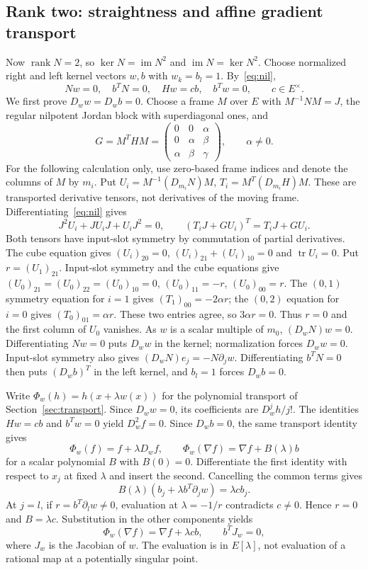 \documentclass[11pt,a4paper]{article}
\newcommand{\rank}{\operatorname{rank}}
\newcommand{\im}{\operatorname{im}}
\begin{document}
\subsection{Rank two: straightness and affine gradient transport}
Now $\rank N=2$, so $\ker N=\im N^2$ and $\im N=\ker N^2$. Choose normalized right and left kernel vectors $w,b$ with $w_k=b_l=1$. By~\eqref{eq:nil},
\[
 Nw=0,\quad b^TN=0,\quad Hw=cb,\quad b^Tw=0,
 \qquad c\in E^\times.
\]
We first prove $D_ww=D_wb=0$. Choose a frame $M$ over $E$ with $M^{-1}NM=J$, the regular nilpotent Jordan block with superdiagonal ones, and
\[
 G=M^THM=\begin{pmatrix}0&0&\alpha\\0&\alpha&\beta\\\alpha&\beta&\gamma\end{pmatrix},\qquad\alpha\ne0.
\]
For the following calculation only, use zero-based frame indices and denote the columns of $M$ by $m_i$. Put $U_i=M^{-1}(D_{m_i}N)M$, $T_i=M^T(D_{m_i}H)M$. These are transported derivative tensors, not derivatives of the moving frame. Differentiating~\eqref{eq:nil} gives
\[
 J^2U_i+JU_iJ+U_iJ^2=0,\qquad (T_iJ+GU_i)^T=T_iJ+GU_i.
\]
Both tensors have input-slot symmetry by commutation of partial derivatives. The cube equation gives $(U_i)_{20}=0$, $(U_i)_{21}+(U_i)_{10}=0$ and $\operatorname{tr} U_i=0$. Put $r=(U_1)_{21}$. Input-slot symmetry and the cube equations give $(U_0)_{21}=(U_0)_{22}=(U_0)_{10}=0$, $(U_0)_{11}=-r$, $(U_0)_{00}=r$. The $(0,1)$ symmetry equation for $i=1$ gives $(T_1)_{00}=-2\alpha r$; the $(0,2)$ equation for $i=0$ gives $(T_0)_{01}=\alpha r$. These two entries agree, so $3\alpha r=0$. Thus $r=0$ and the first column of $U_0$ vanishes. As $w$ is a scalar multiple of $m_0$, $(D_wN)w=0$. Differentiating $Nw=0$ puts $D_ww$ in the kernel; normalization forces $D_ww=0$. Input-slot symmetry also gives $(D_wN)e_j=-N\partial_jw$. Differentiating $b^TN=0$ then puts $(D_wb)^T$ in the left kernel, and $b_l=1$ forces $D_wb=0$.

Write $\Phi_w(h)=h(x+\lambda w(x))$ for the polynomial transport of Section~\ref{sec:transport}. Since $D_ww=0$, its coefficients are $D_w^jh/j!$. The identities $Hw=cb$ and $b^Tw=0$ yield $D_w^2f=0$. Since $D_wb=0$, the same transport identity gives
\[
 \Phi_w(f)=f+\lambda D_wf,\qquad
 \Phi_w(\nabla f)=\nabla f+B(\lambda)b
\]
for a scalar polynomial $B$ with $B(0)=0$. Differentiate the first identity with respect to $x_j$ at fixed $\lambda$ and insert the second. Cancelling the common terms gives
\begin{equation}\label{eq:transport}
 B(\lambda)(b_j+\lambda b^T\partial_j w)=\lambda c b_j.
\end{equation}
At $j=l$, if $r=b^T\partial_lw\ne0$, evaluation at $\lambda=-1/r$ contradicts $c\ne0$. Hence $r=0$ and $B=\lambda c$. Substitution in the other components yields
\begin{equation}\label{eq:key}
 \boxed{\Phi_w(\nabla f)=\nabla f+\lambda cb,\qquad b^TJ_w=0,}
\end{equation}
where $J_w$ is the Jacobian of $w$. The evaluation is in $E[\lambda]$, not evaluation of a rational map at a potentially singular point.
\end{document}
